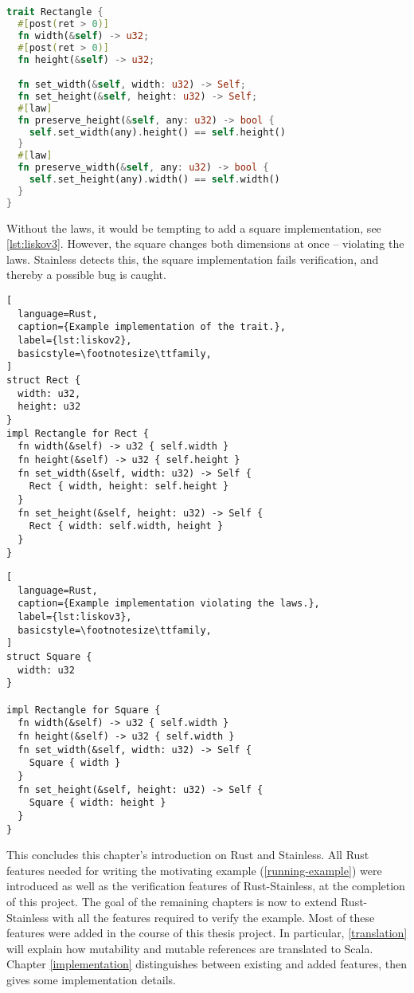 \begin{lstlisting}[language=Rust, caption={Example trait with laws.}, label={lst:liskov1}]
trait Rectangle {
  #[post(ret > 0)]
  fn width(&self) -> u32;
  #[post(ret > 0)]
  fn height(&self) -> u32;

  fn set_width(&self, width: u32) -> Self;
  fn set_height(&self, height: u32) -> Self;
  #[law]
  fn preserve_height(&self, any: u32) -> bool {
    self.set_width(any).height() == self.height()
  }
  #[law]
  fn preserve_width(&self, any: u32) -> bool {
    self.set_height(any).width() == self.width()
  }
}
\end{lstlisting}

Without the laws, it would be tempting to add a square implementation, see
\autoref{lst:liskov3}. However, the square changes both dimensions at once --
violating the laws. Stainless detects this, the square implementation fails
verification, and thereby a possible bug is caught.

\noindent
\begin{minipage}[t]{.49\textwidth}
\begin{lstlisting}[
  language=Rust,
  caption={Example implementation of the trait.},
  label={lst:liskov2},
  basicstyle=\footnotesize\ttfamily,
]
struct Rect {
  width: u32,
  height: u32
}
impl Rectangle for Rect {
  fn width(&self) -> u32 { self.width }
  fn height(&self) -> u32 { self.height }
  fn set_width(&self, width: u32) -> Self {
    Rect { width, height: self.height }
  }
  fn set_height(&self, height: u32) -> Self {
    Rect { width: self.width, height }
  }
}
\end{lstlisting}
\end{minipage}\hfill
\begin{minipage}[t]{.49\textwidth}
\begin{lstlisting}[
  language=Rust,
  caption={Example implementation violating the laws.},
  label={lst:liskov3},
  basicstyle=\footnotesize\ttfamily,
]
struct Square {
  width: u32
}

impl Rectangle for Square {
  fn width(&self) -> u32 { self.width }
  fn height(&self) -> u32 { self.width }
  fn set_width(&self, width: u32) -> Self {
    Square { width }
  }
  fn set_height(&self, height: u32) -> Self {
    Square { width: height }
  }
}
\end{lstlisting}
\end{minipage}


This concludes this chapter's introduction on Rust and Stainless. All Rust
features needed for writing the motivating example (\autoref{running-example})
were introduced as well as the verification features of Rust-Stainless, at the
completion of this project. The goal of the remaining chapters is now to extend
Rust-Stainless with all the features required to verify the example. Most of
these features were added in the course of this thesis project. In particular,
\autoref{translation} will explain how mutability and mutable references are
translated to Scala. Chapter \ref{implementation} distinguishes between existing
and added features, then gives some implementation details.


